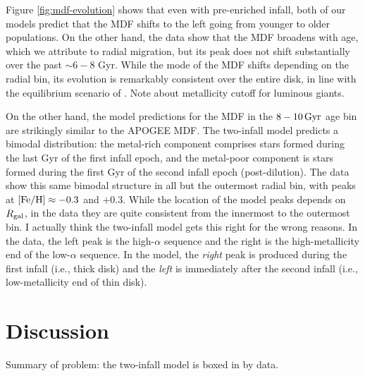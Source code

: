 \documentclass[twocolumn,twocolappendix,linenumbers]{aastex631}
\newcommand{\mathFeH}{{\rm [Fe/H]}}
\newcommand{\todo}[1]{{\color{red}#1}}
\begin{document}
Figure \ref{fig:mdf-evolution} shows that even with pre-enriched infall, both of our models predict that the MDF shifts to the left going from younger to older populations. On the other hand, the data show that the MDF broadens with age, which we attribute to radial migration, but its peak does not shift substantially over the past $\sim6-8$ Gyr. While the mode of the MDF shifts depending on the radial bin, its evolution is remarkably consistent over the entire disk, in line with the equilibrium scenario of \citet{johnson_milky_2024}.
\todo{Note about metallicity cutoff for luminous giants.}

On the other hand, the model predictions for the MDF in the $8-10\,{\rm Gyr}$ age bin are strikingly similar to the APOGEE MDF. The two-infall model predicts a bimodal distribution: the metal-rich component comprises stars formed during the last Gyr of the first infall epoch, and the metal-poor component is stars formed during the first Gyr of the second infall epoch (post-dilution). The data show this same bimodal structure in all but the outermost radial bin, with peaks at $\mathFeH\approx-0.3$ and $+0.3$. While the location of the model peaks depends on $R_{\rm gal}$, in the data they are quite consistent from the innermost to the outermost bin. \todo{I actually think the two-infall model gets this right for the wrong reasons. In the data, the left peak is the high-$\alpha$ sequence and the right is the high-metallicity end of the low-$\alpha$ sequence. In the model, the {\it right} peak is produced during the first infall (i.e., thick disk) and the {\it left} is immediately after the second infall (i.e., low-metallicity end of thin disk).}

\section{Discussion}
\label{sec:discussion}

\todo{Summary of problem: the two-infall model is boxed in by data.}


\end{document}

